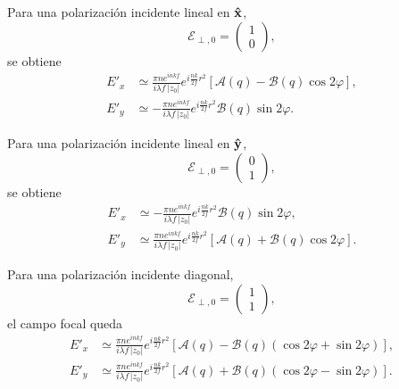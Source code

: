Para una polarización incidente lineal en $\bm{\hat{\mathbf{x}}}$,
\begin{equation}
\mathscr E_{\perp,0}
=
\begin{pmatrix}
1\\
0
\end{pmatrix},
\end{equation}
se obtiene
\begin{equation}
\begin{aligned}
E'_x
&\simeq
\frac{\pi n e^{inkf}}{i\lambda f\,|z_0|}
e^{i\frac{nk}{2f}r^2}
\left[
\mathcal A(q)
-
\mathcal B(q)\cos2\varphi
\right],
\\
E'_y
&\simeq
-
\frac{\pi n e^{inkf}}{i\lambda f\,|z_0|}
e^{i\frac{nk}{2f}r^2}
\mathcal B(q)\sin2\varphi.
\end{aligned}
\label{eq:cartesian_case_10}
\end{equation}

Para una polarización incidente lineal en $\bm{\hat{\mathbf{y}}}$,
\begin{equation}
\mathscr E_{\perp,0}
=
\begin{pmatrix}
0\\
1
\end{pmatrix},
\end{equation}
se obtiene
\begin{equation}
\begin{aligned}
E'_x
&\simeq
-
\frac{\pi n e^{inkf}}{i\lambda f\,|z_0|}
e^{i\frac{nk}{2f}r^2}
\mathcal B(q)\sin2\varphi,
\\
E'_y
&\simeq
\frac{\pi n e^{inkf}}{i\lambda f\,|z_0|}
e^{i\frac{nk}{2f}r^2}
\left[
\mathcal A(q)
+
\mathcal B(q)\cos2\varphi
\right].
\end{aligned}
\label{eq:cartesian_case_01}
\end{equation}

Para una polarización incidente diagonal,
\begin{equation}
\mathscr E_{\perp,0}
=
\begin{pmatrix}
1\\
1
\end{pmatrix},
\end{equation}
el campo focal queda
\begin{equation}
\begin{aligned}
E'_x
&\simeq
\frac{\pi n e^{inkf}}{i\lambda f\,|z_0|}
e^{i\frac{nk}{2f}r^2}
\left[
\mathcal A(q)
-
\mathcal B(q)
\left(
\cos2\varphi+\sin2\varphi
\right)
\right],
\\
E'_y
&\simeq
\frac{\pi n e^{inkf}}{i\lambda f\,|z_0|}
e^{i\frac{nk}{2f}r^2}
\left[
\mathcal A(q)
+
\mathcal B(q)
\left(
\cos2\varphi-\sin2\varphi
\right)
\right].
\end{aligned}
\label{eq:cartesian_case_11}
\end{equation}

